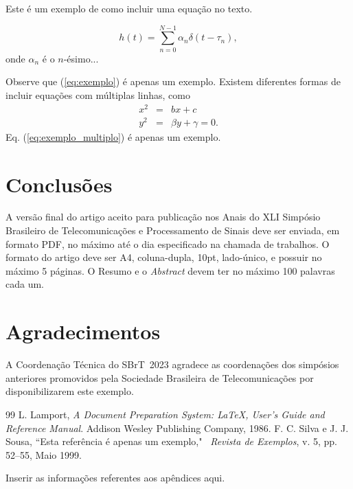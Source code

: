 \documentclass{sbrt}
\begin{document}
Este é um exemplo de como incluir uma equação no texto.

\begin{equation}\label{eq:exemplo}
    h(t)=\sum_{n=0}^{N-1} \alpha_n\delta(t-\tau_n),
\end{equation}
onde $\alpha_n$ é o $n$-ésimo...

Observe que (\ref{eq:exemplo}) é apenas um exemplo. Existem diferentes formas de incluir equações com múltiplas linhas, como
\begin{equation} \label{eq:exemplo_multiplo}
    \begin{array}{ccl}
        x^2 & = & bx+c\\
        y^2 & = &\beta y+\gamma=0.
    \end{array}
\end{equation}
Eq. (\ref{eq:exemplo_multiplo}) é apenas um exemplo.

\section{Conclusões}
A versão final do artigo aceito para publicação nos Anais do XLI Simpósio Brasileiro de Telecomunicações e Processamento de Sinais deve ser enviada, em formato PDF, no máximo até o dia especificado na chamada de trabalhos. O formato do artigo deve ser A4, coluna-dupla, 10pt, lado-único, e possuir no máximo 5 páginas. O Resumo e o \emph{Abstract} devem ter no máximo 100 palavras cada um.

\section*{Agradecimentos}
A Coordenação Técnica do SBrT~2023 agradece as coordenações dos simpósios anteriores promovidos pela Sociedade Brasileira de Telecomunicações por disponibilizarem este exemplo.

\begin{thebibliography}{99}
 L. Lamport, \textit{A Document Preparation System: \LaTeX, User's
Guide and Reference Manual}. Addison Wesley Publishing Company,
1986.
 F. C. Silva e J. J. Sousa, ``Esta referência é apenas um exemplo," ~\textit{Revista de Exemplos}, v. 5, pp. 52--55, Maio
1999.
\end{thebibliography}


\appendix
Inserir as informações referentes aos apêndices aqui.
\end{document}
